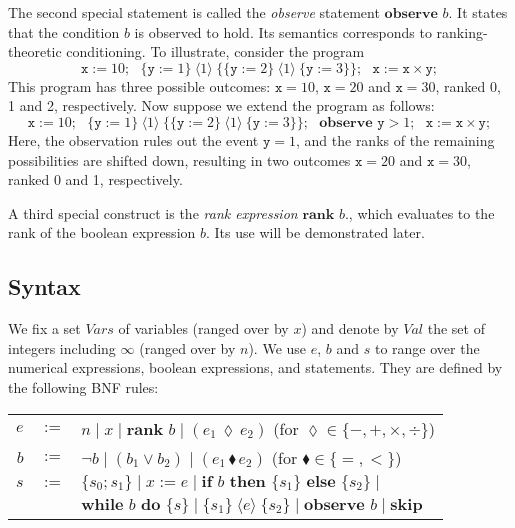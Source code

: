 \documentclass{llncs}
\newcommand{\vars}{\textit{Vars}}
\newcommand{\values}{\textit{Val}}
\newcommand{\Rank}[1]{\hspace{3pt} \pmb{\langle} #1 \pmb{\rangle}\hspace{3pt} } %
\newcommand{\areth}{\lozenge}
\newcommand{\comp}{\blacklozenge}
\begin{document}
The second special statement is called the \emph{observe} statement
	$\textbf{observe }b.$
It states that the condition $b$ is observed to hold.
Its semantics corresponds to ranking-theoretic conditioning.
To illustrate, consider the program
	$$\texttt{x} := 10;\mbox{ } \{ \texttt{y} := 1 \} \Rank{1} \{ \{\texttt{y} := 2\} \Rank{1} \{\texttt{y} := 3\} \};\mbox{ } \texttt{x} := \texttt{x} \times \texttt{y};$$
This program has three possible outcomes: $\texttt{x} = 10$, $\texttt{x} = 20$ and $\texttt{x} = 30$, ranked 0, 1 and 2, respectively.
Now suppose we extend the program as follows: 
	$$\texttt{x} := 10;\mbox{ } \{ \texttt{y} := 1 \} \Rank{1} \{ \{\texttt{y} := 2\} \Rank{1} \{\texttt{y} := 3\} \};\mbox{ } \textbf{observe } \texttt{y} > 1;\mbox{ } \texttt{x} := \texttt{x} \times \texttt{y};$$
Here, the observation rules out the event $\texttt{y} = 1$,
	and the ranks of the remaining possibilities are shifted down, 
	resulting in two outcomes $\texttt{x} = 20$ and $\texttt{x} = 30$, ranked 0 and 1, respectively.

A third special construct is the \emph{rank expression} $\textbf{rank }b.$, which evaluates to the rank of the boolean expression $b$.
Its use will be demonstrated later.

\subsection{Syntax}

We fix a set $\vars$ of variables (ranged over by $x$) and denote by $\values$ the set of integers including $\infty$ (ranged over by $n$).
We use $e$, $b$ and $s$ to range over the numerical expressions, boolean expressions, and statements.
They are defined by the following BNF rules:
\noindent \begin{center}
\begin{tabular}{rcl}
$\textit{e}$	& $:=$ 	& $n \mid x \mid \textbf{rank }b \mid (e_1 \hspace{2pt} \areth \hspace{2pt} e_2)$ (for $\areth \in \{ -, +, \times, \div \}$)\\

$\textit{b}$	& $:=$ 	& $\neg b \mid (b_1 \vee b_2) \mid (e_1 \hspace{2pt} \comp \hspace{2pt} e_2)$ (for $\comp \in \{ =, < \}$)\\

$\textit{s}$		& $:=$ 	& $\{s_0; s_1 \} \mid x := e \mid \textbf{if }b\textbf{ then }\{ s_1 \}\textbf{ else } \{ s_2 \} \mid $\\
			& 		& $\textbf{while } b \textbf{ do } \{ s \} \mid \{ s_1 \} \Rank{e} \{ s_2 \} \mid \textbf{observe }b \mid \textbf{skip}$\\
\end{tabular}
\end{center}
\end{document}
